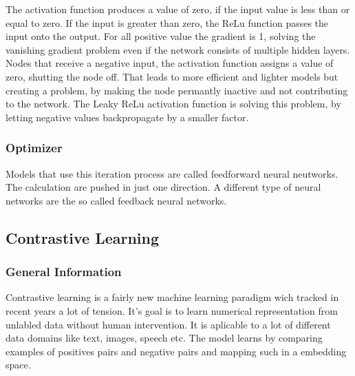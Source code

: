 The activation function produces a value of zero, if the input value is less than or equal to zero.
If the input is greater than zero, the ReLu function passes the input onto the output.
For all positive value the gradient is 1, solving the vanishing gradient problem even if the network consists of multiple hidden layers.
Nodes that receive a negative input, the activation function  assigns a value of zero, shutting the node off.
That leads to more efficient and lighter models but creating a problem, by making the node permantly inactive and not contributing to the network.
The Leaky ReLu activation function is solving this problem, by letting negative values backpropagate by a smaller factor.


\subsubsection{Optimizer}


Models that use this iteration process are called feedforward neural neutworks. 
The calculation are pushed in just one direction.
A different type of neural networks are the so called feedback neural networks. 


\subsection{Contrastive Learning}
\subsubsection{General Information}
Contrastive learning is a fairly new machine learning paradigm wich tracked in recent years a lot of tension.
It's goal is to learn numerical representation from unlabled data without human intervention.
It is aplicable to a lot of different data domains like text, images, speech etc.
The model learns by comparing examples of positives pairs and negative pairs and mapping such in a embedding space.

